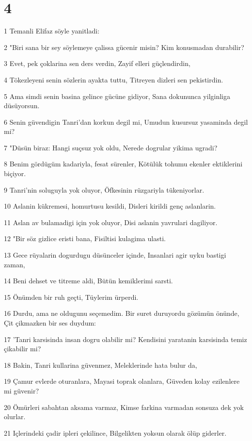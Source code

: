 \chapter{4}

\par 1 Temanli Elifaz söyle yanitladi:
\par 2 "Biri sana bir sey söylemeye çalissa gücenir misin? Kim konusmadan durabilir?
\par 3 Evet, pek çoklarina sen ders verdin, Zayif elleri güçlendirdin,
\par 4 Tökezleyeni senin sözlerin ayakta tuttu, Titreyen dizleri sen pekistirdin.
\par 5 Ama simdi senin basina gelince gücüne gidiyor, Sana dokununca yilginliga düsüyorsun.
\par 6 Senin güvendigin Tanri'dan korkun degil mi, Umudun kusursuz yasaminda degil mi?
\par 7 "Düsün biraz: Hangi suçsuz yok oldu, Nerede dogrular yikima ugradi?
\par 8 Benim gördügüm kadariyla, fesat sürenler, Kötülük tohumu ekenler ektiklerini biçiyor.
\par 9 Tanri'nin soluguyla yok oluyor, Öfkesinin rüzgariyla tükeniyorlar.
\par 10 Aslanin kükremesi, homurtusu kesildi, Disleri kirildi genç aslanlarin.
\par 11 Aslan av bulamadigi için yok oluyor, Disi aslanin yavrulari dagiliyor.
\par 12 "Bir söz gizlice eristi bana, Fisiltisi kulagima ulasti.
\par 13 Gece rüyalarin dogurdugu düsünceler içinde, Insanlari agir uyku bastigi zaman,
\par 14 Beni dehset ve titreme aldi, Bütün kemiklerimi sarsti.
\par 15 Önümden bir ruh geçti, Tüylerim ürperdi.
\par 16 Durdu, ama ne oldugunu seçemedim. Bir suret duruyordu gözümün önünde, Çit çikmazken bir ses duydum:
\par 17 'Tanri karsisinda insan dogru olabilir mi? Kendisini yaratanin karsisinda temiz çikabilir mi?
\par 18 Bakin, Tanri kullarina güvenmez, Meleklerinde hata bulur da,
\par 19 Çamur evlerde oturanlara, Mayasi toprak olanlara, Güveden kolay ezilenlere mi güvenir?
\par 20 Ömürleri sabahtan aksama varmaz, Kimse farkina varmadan sonsuza dek yok olurlar.
\par 21 Içlerindeki çadir ipleri çekilince, Bilgelikten yoksun olarak ölüp giderler.

